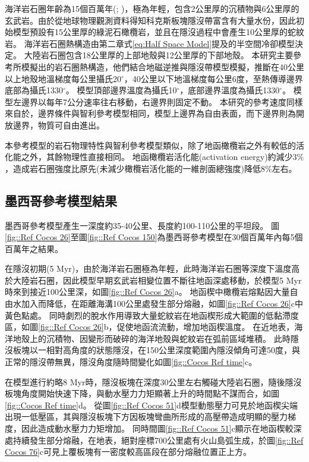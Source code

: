 海洋岩石圈年齡為15個百萬年(\citealp{Manea2011Thermal}; \citealp{muller2019})，極為年輕，包含2公里厚的沉積物與6公里厚的玄武岩。由於從地球物理觀測資料得知科克斯板塊隱沒帶富含有大量水份，因此初始模型預設有15公里厚的綠泥石橄欖岩，並且在隱沒過程中會產生10公里厚的蛇紋岩。
海洋岩石圈熱構造由第二章式\ref{eq:Half Space Model}提及的半空間冷卻模型決定。
大陸岩石圈包含18公里厚的上部地殼與12公里厚的下部地殼。
本研究主要參考\citet{Manea2011Curie}所模擬出的岩石圈熱構造，他們結合地磁逆推與隱沒帶模型模擬，推斷在40公里以上地殼地溫梯度每公里攝氏20$^{\circ}$，40公里以下地溫梯度每公里6度，至熱傳導邊界底部為攝氏1330$^{\circ}$。
模型頂部邊界溫度為攝氏10$^{\circ}$，底部邊界溫度為攝氏1330$^{\circ}$。
模型左邊界以每年7公分速率往右移動，右邊界則固定不動。
本研究的參考速度同樣來自於\citet{o2005uncertainties}，邊界條件與智利參考模型相同，模型上邊界為自由表面，而下邊界則為開放邊界，物質可自由進出。

本參考模型的岩石物理特性與智利參考模型類似，除了地函橄欖岩之外有較低的活化能之外，其餘物理性直接相同。
地函橄欖岩活化能(activation energy)約減少3$\%$，造成岩石圈強度比原先(未減少橄欖岩活化能的一維剖面總強度)降低8$\%$左右。


\subsection{墨西哥參考模型結果}\label{墨西哥參考模型結果}
墨西哥參考模型產生一深度約35-40公里、長度約100-110公里的平坦段。
圖\ref{fig::Ref Cocos 26}至圖\ref{fig::Ref Cocos 150}為墨西哥參考模型在30個百萬年內每5個百萬年之結果。

在隱沒初期(5 Myr)，由於海洋岩石圈極為年輕，此時海洋岩石圈等深度下溫度高於大陸岩石圈，因此模型早期玄武岩相變位置不斷往地函深處移動，於模型5 Myr時來到接近100公里深，如圖\ref{fig::Ref Cocos 26}a。
地函楔中橄欖岩熔點因大量自由水加入而降低，在距離海溝100公里處發生部分熔融，如圖\ref{fig::Ref Cocos 26}c中黃色點處。
同時劇烈的脫水作用導致大量蛇紋岩在地函楔形成大範圍的低黏滯度區，如圖\ref{fig::Ref Cocos 26}b，促使地函流流動，增加地函楔溫度。
在近地表，海洋地殼上的沉積物、因變形而破碎的海洋地殼與蛇紋岩在弧前區域堆積。
此時隱沒板塊以一相對高角度的狀態隱沒，在150公里深度範圍內隱沒傾角可達50度，與正常的隱沒帶無異，隱沒角度隨時間變化如圖\ref{fig::Cocos Ref time}c。

在模型進行約略8 Myr時，隱沒板塊在深度30公里左右觸碰大陸岩石圈，隨後隱沒板塊角度開始快速下降，與動水壓力力矩顯著上升的時間點不謀而合，如圖\ref{fig::Cocos Ref time}d。
從圖\ref{fig::Ref Cocos 51}d模型動態壓力可見於地函楔尖端出現一低壓區，其與隱沒板塊下方因板塊彎曲所形成的高壓帶造成明顯的壓力梯度，因此造成動水壓力力矩增加。
同時間圖\ref{fig::Ref Cocos 51}c顯示在地函楔較深處持續發生部分熔融，在地表，絕對座標700公里處有火山島弧生成，於圖\ref{fig::Ref Cocos 76}c可見上覆板塊有一密度較高區段在部分熔融位置正上方。

